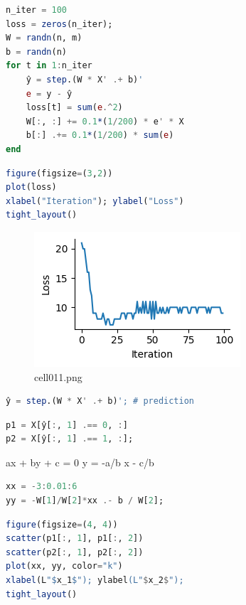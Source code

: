 \begin{lstlisting}[language=julia]
n_iter = 100
loss = zeros(n_iter);
W = randn(n, m)
b = randn(n)
for t in 1:n_iter
    ŷ = step.(W * X' .+ b)'
    e = y - ŷ
    loss[t] = sum(e.^2) 
    W[:, :] += 0.1*(1/200) * e' * X
    b[:] .+= 0.1*(1/200) * sum(e)
end
\end{lstlisting}
\begin{lstlisting}[language=julia]
figure(figsize=(3,2))
plot(loss)
xlabel("Iteration"); ylabel("Loss")
tight_layout()
\end{lstlisting}
\begin{figure}[ht]
	\centering
	\includegraphics[scale=0.8, max width=\linewidth]{./fig/local-learning-rule/logistic-regression-perceptron/cell011.png}
	\caption{cell011.png}
	\label{cell011.png}
\end{figure}
\begin{lstlisting}[language=julia]
ŷ = step.(W * X' .+ b)'; # prediction
\end{lstlisting}
\begin{lstlisting}[language=julia]
p1 = X[ŷ[:, 1] .== 0, :]
p2 = X[ŷ[:, 1] .== 1, :];
\end{lstlisting}
ax + by + c = 0  
y = -a/b x - c/b
\begin{lstlisting}[language=julia]
xx = -3:0.01:6
yy = -W[1]/W[2]*xx .- b / W[2];
\end{lstlisting}
\begin{lstlisting}[language=julia]
figure(figsize=(4, 4))
scatter(p1[:, 1], p1[:, 2])
scatter(p2[:, 1], p2[:, 2])
plot(xx, yy, color="k")
xlabel(L"$x_1$"); ylabel(L"$x_2$"); 
tight_layout()
\end{lstlisting}
